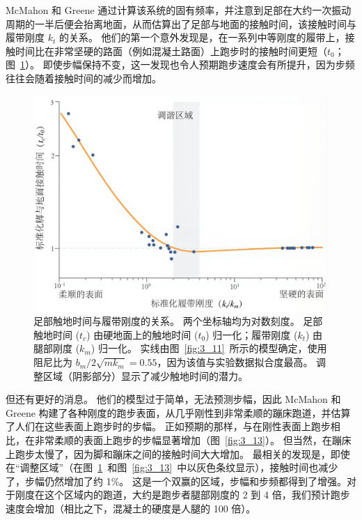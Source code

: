McMahon 和 Greene 通过计算该系统的固有频率，并注意到足部在大约一次振动周期的一半后便会抬离地面，从而估算出了足部与地面的接触时间，该接触时间与履带刚度 $k_t$ 的关系。
他们的第一个意外发现是，在一系列中等刚度的履带上，接触时间比在非常坚硬的路面（例如混凝土路面）上跑步时的接触时间更短（$t_0$；图~\ref{fig:3_12}）。
即使步幅保持不变，这一发现也令人预期跑步速度会有所提升，因为步频往往会随着接触时间的减少而增加。

\begin{figure}[!htb]
	\centering
	\includegraphics[width=1.0\linewidth]{chap3/3_12}
	\caption{足部触地时间与履带刚度的关系。
		两个坐标轴均为对数刻度。
		足部触地时间 ($t_c$) 由硬地面上的触地时间 ($t_0$) 归一化；履带刚度 ($k_t$) 由腿部刚度 ($k_m$) 归一化。
		实线由图~\ref{fig:3_11}~所示的模型确定，使用阻尼比为 ${b_m} / {2\sqrt{m k_m}} = 0.55$，因为该值与实验数据拟合度最高。
		调整区域（阴影部分）显示了减少触地时间的潜力\cite{mcmahon1984muscles}。 \label{fig:3_12}}
\end{figure}

但还有更好的消息。
他们的模型过于简单，无法预测步幅，因此 McMahon 和 Greene 构建了各种刚度的跑步表面，从几乎刚性到非常柔顺的蹦床跑道，并估算了人们在这些表面上跑步时的步幅。
正如预期的那样，与在刚性表面上跑步相比，在非常柔顺的表面上跑步的步幅显著增加（图~\ref{fig:3_13}）。
但当然，在蹦床上跑步太慢了，因为脚和蹦床之间的接触时间大大增加。
最相关的发现是，即使在“调整区域”（在图~\ref{fig:3_12}~和图~\ref{fig:3_13}~中以灰色条纹显示），接触时间也减少了，步幅仍然增加了约 1\%。
这是一个双赢的区域，步幅和步频都得到了增强。对于刚度在这个区域内的跑道，大约是跑步者腿部刚度的 2 到 4 倍，我们预计跑步速度会增加（相比之下，混凝土的硬度是人腿的 100 倍）。

